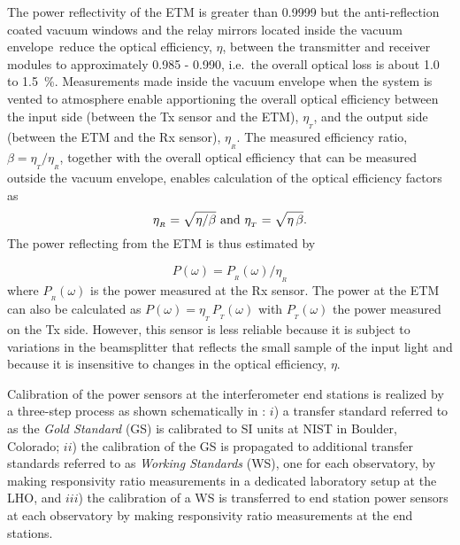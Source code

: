 \documentclass[12pt,a4paper,final]{iopart}
\begin{document}
The power reflectivity of the ETM is greater than 0.9999 but the anti-reflection coated vacuum windows and the relay mirrors located inside the vacuum envelope\,\cite{RSIpaper} reduce the optical efficiency, $\eta$, between the transmitter and receiver modules to approximately 0.985 - 0.990, i.e.\ the overall optical loss is about \num{1.0} to \SI{1.5}{\percent}. 
Measurements made inside the vacuum envelope when the system is vented to atmosphere enable apportioning the overall optical efficiency between the input side (between the Tx sensor and the ETM), $\eta_{_T}$, and the output side (between the ETM and the Rx sensor), $\eta_{_R}$.  The measured efficiency ratio, $\beta = \eta_{_{T}} / \eta_{_{R}}$, together with the overall optical efficiency that can be measured outside the vacuum envelope, enables calculation of the optical efficiency factors as
%
\begin{equation}
\label{eq:etaRetaT}
  \eta_{_{R}} = \sqrt{\eta/\beta} \ {\rm and} \ \eta_{_{T}} = \sqrt{\eta \, \beta}.  
\end{equation}
%
The power reflecting from the ETM is thus estimated by

\begin{equation}
\label{eq:power_prime}
    P(\omega) = P_{_R}(\omega) / \eta_{_R}
\end{equation}
%
where $P_{_{R}}(\omega)$ is the power measured at the Rx sensor.  The power at the ETM can also be calculated as $ P(\omega) = \eta_{_T} \,P_{_T}(\omega)$ with $P_{_{T}}(\omega)$ the power measured on the Tx side.  However, this sensor is less reliable because it is subject to variations in the beamsplitter that reflects the small sample of the input light and because it is insensitive to changes in the optical efficiency, $\eta$.

Calibration of the power sensors at the interferometer end stations is realized by a three-step process as shown schematically in : $i$) a transfer standard referred to as the {\em Gold Standard} (GS) is calibrated to SI units at NIST in Boulder, Colorado; $ii$) the calibration of the GS is propagated to additional transfer standards referred to as {\em Working Standards} (WS), one for each observatory, by making responsivity ratio measurements in a dedicated laboratory setup at the LHO, and $iii$) the calibration of a WS is transferred to end station power sensors at each observatory by making responsivity ratio measurements at the end stations.
\end{document}
